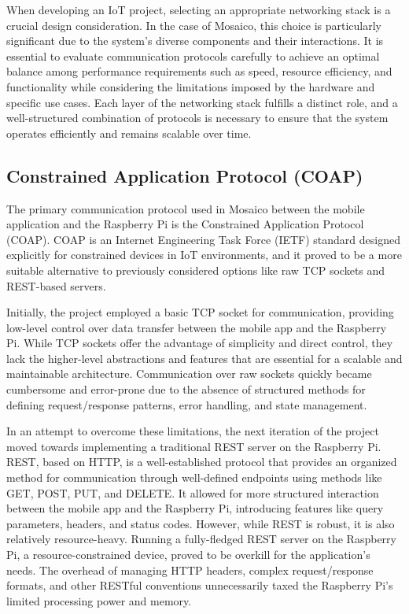 When developing an IoT project, selecting an appropriate networking stack is a crucial design consideration. In the case of Mosaico, this choice is particularly significant due to the system's diverse components and their interactions. It is essential to evaluate communication protocols carefully to achieve an optimal balance among performance requirements such as speed, resource efficiency, and functionality while considering the limitations imposed by the hardware and specific use cases. Each layer of the networking stack fulfills a distinct role, and a well-structured combination of protocols is necessary to ensure that the system operates efficiently and remains scalable over time.

\subsection{Constrained Application Protocol (COAP)}

The primary communication protocol used in Mosaico between the mobile application and the Raspberry Pi is the Constrained Application Protocol \cite{rfc7252} (COAP). COAP is an Internet Engineering Task Force (IETF) standard designed explicitly for constrained devices in IoT environments, and it proved to be a more suitable alternative to previously considered options like raw TCP sockets and REST-based servers.

Initially, the project employed a basic TCP socket for communication, providing low-level control over data transfer between the mobile app and the Raspberry Pi. While TCP sockets offer the advantage of simplicity and direct control, they lack the higher-level abstractions and features that are essential for a scalable and maintainable architecture. Communication over raw sockets quickly became cumbersome and error-prone due to the absence of structured methods for defining request/response patterns, error handling, and state management.

In an attempt to overcome these limitations, the next iteration of the project moved towards implementing a traditional REST server on the Raspberry Pi. REST, based on HTTP, is a well-established protocol that provides an organized method for communication through well-defined endpoints using methods like GET, POST, PUT, and DELETE. It allowed for more structured interaction between the mobile app and the Raspberry Pi, introducing features like query parameters, headers, and status codes. However, while REST is robust, it is also relatively resource-heavy. Running a fully-fledged REST server on the Raspberry Pi, a resource-constrained device, proved to be overkill for the application’s needs. The overhead of managing HTTP headers, complex request/response formats, and other RESTful conventions unnecessarily taxed the Raspberry Pi’s limited processing power and memory.

